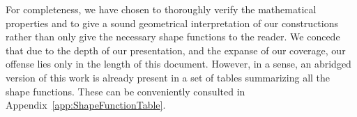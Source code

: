 For completeness, we have chosen to thoroughly verify the mathematical properties and to give a sound geometrical interpretation of our constructions rather than only give the necessary shape functions to the reader.
We concede that due to the depth of our presentation, and the expanse of our coverage, our offense lies only in the length of this document.
However, in a sense, an abridged version of this work is already present in a set of tables summarizing all the shape functions.
These can be conveniently consulted in Appendix~\ref{app:ShapeFunctionTable}. %




